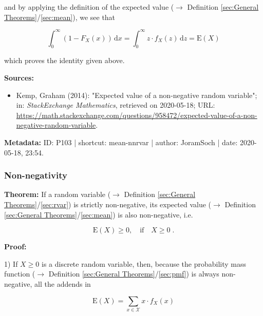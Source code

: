 \documentclass[a4paper,12pt,twoside]{book}
\begin{document}
and by applying the definition of the expected value ($\rightarrow$ Definition \ref{sec:General Theorems}/\ref{sec:mean}), we see that

\begin{equation} \label{eq:mean-nnrvar-mean-cdf-s3}
\int_{0}^{\infty} (1 - F_X(x)) \, \mathrm{d}x = \int_{0}^{\infty} z \cdot f_X(z) \, \mathrm{d}z = \mathrm{E}(X)
\end{equation}

which proves the identity given above.



\vspace{1em}
\textbf{Sources:}
\begin{itemize}
\item Kemp, Graham (2014): "Expected value of a non-negative random variable"; in: \textit{StackExchange Mathematics}, retrieved on 2020-05-18; URL: \url{https://math.stackexchange.com/questions/958472/expected-value-of-a-non-negative-random-variable}.
\end{itemize}


\vspace{1em}
\textbf{Metadata:} ID: P103 | shortcut: mean-nnrvar | author: JoramSoch | date: 2020-05-18, 23:54.
\vspace{1em}



\subsubsection[\textbf{Non-negativity}]{Non-negativity} \label{sec:mean-nonneg}
\setcounter{equation}{0}

\textbf{Theorem:} If a random variable ($\rightarrow$ Definition \ref{sec:General Theorems}/\ref{sec:rvar}) is strictly non-negative, its expected value ($\rightarrow$ Definition \ref{sec:General Theorems}/\ref{sec:mean}) is also non-negative, i.e.

\begin{equation} \label{eq:mean-nonneg-mean-nonneg}
\mathrm{E}(X) \geq 0, \quad \text{if} \quad X \geq 0 \; .
\end{equation}


\vspace{1em}
\textbf{Proof:}

1) If $X \geq 0$ is a discrete random variable, then, because the probability mass function ($\rightarrow$ Definition \ref{sec:General Theorems}/\ref{sec:pmf}) is always non-negative, all the addends in

\begin{equation} \label{eq:mean-nonneg-mean-disc}
\mathrm{E}(X) = \sum_{x \in \mathcal{X}} x \cdot f_X(x)
\end{equation}
\end{document}
